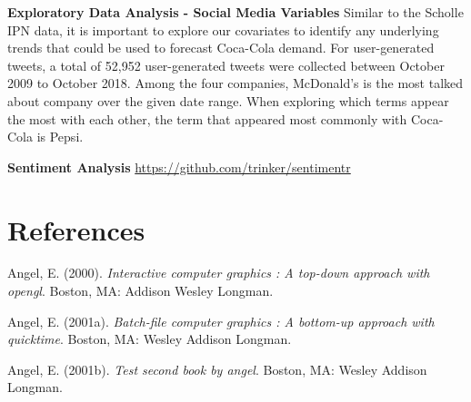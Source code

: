 \documentclass[12pt,oneside]{chicagocapstone}
\begin{document}
\textbf{Exploratory Data Analysis - Social Media Variables} Similar to
the Scholle IPN data, it is important to explore our covariates to
identify any underlying trends that could be used to forecast Coca-Cola
demand. For user-generated tweets, a total of 52,952 user-generated
tweets were collected between October 2009 to October 2018. Among the
four companies, McDonald's is the most talked about company over the
given date range. When exploring which terms appear the most with each
other, the term that appeared most commonly with Coca-Cola is Pepsi.

\textbf{Sentiment Analysis} \url{https://github.com/trinker/sentimentr}

\backmatter

\chapter*{References}\label{references}


\noindent

\setlength{\parindent}{-0.20in} \setlength{\leftskip}{0.20in}
\setlength{\parskip}{8pt}

\hypertarget{refs}{}
\hypertarget{ref-angel2000}{}
Angel, E. (2000). \emph{Interactive computer graphics : A top-down
approach with opengl}. Boston, MA: Addison Wesley Longman.

\hypertarget{ref-angel2001}{}
Angel, E. (2001a). \emph{Batch-file computer graphics : A bottom-up
approach with quicktime}. Boston, MA: Wesley Addison Longman.

\hypertarget{ref-angel2002a}{}
Angel, E. (2001b). \emph{Test second book by angel}. Boston, MA: Wesley
Addison Longman.


\end{document}
